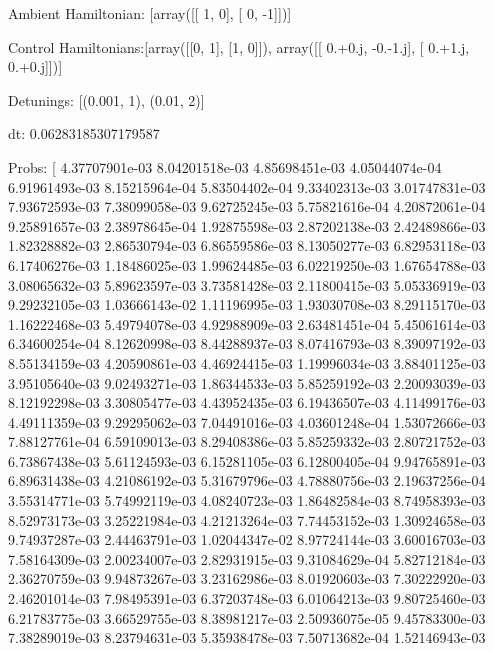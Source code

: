 \documentclass{article}
\begin{document}
    

\newpage

Ambient Hamiltonian: [array([[ 1,  0],
       [ 0, -1]])]

Control Hamiltonians:[array([[0, 1],
       [1, 0]]), array([[ 0.+0.j, -0.-1.j],
       [ 0.+1.j,  0.+0.j]])]

Detunings: [(0.001, 1), (0.01, 2)]

 dt: 0.06283185307179587

Probs: [  4.37707901e-03   8.04201518e-03   4.85698451e-03   4.05044074e-04
   6.91961493e-03   8.15215964e-04   5.83504402e-04   9.33402313e-03
   3.01747831e-03   7.93672593e-03   7.38099058e-03   9.62725245e-03
   5.75821616e-04   4.20872061e-04   9.25891657e-03   2.38978645e-04
   1.92875598e-03   2.87202138e-03   2.42489866e-03   1.82328882e-03
   2.86530794e-03   6.86559586e-03   8.13050277e-03   6.82953118e-03
   6.17406276e-03   1.18486025e-03   1.99624485e-03   6.02219250e-03
   1.67654788e-03   3.08065632e-03   5.89623597e-03   3.73581428e-03
   2.11800415e-03   5.05336919e-03   9.29232105e-03   1.03666143e-02
   1.11196995e-03   1.93030708e-03   8.29115170e-03   1.16222468e-03
   5.49794078e-03   4.92988909e-03   2.63481451e-04   5.45061614e-03
   6.34600254e-04   8.12620998e-03   8.44288937e-03   8.07416793e-03
   8.39097192e-03   8.55134159e-03   4.20590861e-03   4.46924415e-03
   1.19996034e-03   3.88401125e-03   3.95105640e-03   9.02493271e-03
   1.86344533e-03   5.85259192e-03   2.20093039e-03   8.12192298e-03
   3.30805477e-03   4.43952435e-03   6.19436507e-03   4.11499176e-03
   4.49111359e-03   9.29295062e-03   7.04491016e-03   4.03601248e-04
   1.53072666e-03   7.88127761e-04   6.59109013e-03   8.29408386e-03
   5.85259332e-03   2.80721752e-03   6.73867438e-03   5.61124593e-03
   6.15281105e-03   6.12800405e-04   9.94765891e-03   6.89631438e-03
   4.21086192e-03   5.31679796e-03   4.78880756e-03   2.19637256e-04
   3.55314771e-03   5.74992119e-03   4.08240723e-03   1.86482584e-03
   8.74958393e-03   8.52973173e-03   3.25221984e-03   4.21213264e-03
   7.74453152e-03   1.30924658e-03   9.74937287e-03   2.44463791e-03
   1.02044347e-02   8.97724144e-03   3.60016703e-03   7.58164309e-03
   2.00234007e-03   2.82931915e-03   9.31084629e-04   5.82712184e-03
   2.36270759e-03   9.94873267e-03   3.23162986e-03   8.01920603e-03
   7.30222920e-03   2.46201014e-03   7.98495391e-03   6.37203748e-03
   6.01064213e-03   9.80725460e-03   6.21783775e-03   3.66529755e-03
   8.38981217e-03   2.50936075e-05   9.45783300e-03   7.38289019e-03
   8.23794631e-03   5.35938478e-03   7.50713682e-04   1.52146943e-03
\end{document}
